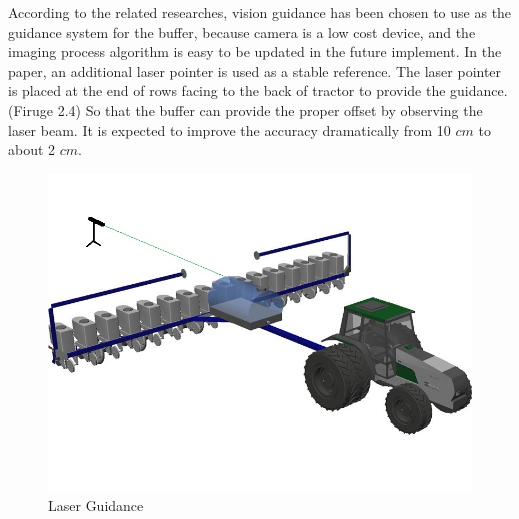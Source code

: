 \documentclass[letterpaper,12pt,oneside]{book}
\begin{document}
		According to the related researches, vision guidance has been chosen to use as the guidance system for the buffer, because camera is a low cost device, and the imaging process algorithm is easy to be updated in the future implement. In the paper, an additional laser pointer is used as a stable reference. The laser pointer is placed at the end of rows facing to the back of tractor to provide the guidance. (Firuge 2.4) So that the buffer can provide the proper offset by observing the laser beam. It is expected to improve the accuracy dramatically from 10 $cm$ to about 2 $cm$. 
		\begin{figure}[ht!]
			\begin{center}
				\includegraphics[scale = 0.6]{tractor.jpg}
				\caption{Laser Guidance}
			\end{center}
		\end{figure}
		
\end{document}
